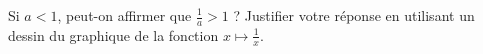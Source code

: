 
\begin{exercice}\label{exosmath-0257}

    Si \( a<1\), peut-on affirmer que \( \frac{1}{ a }>1\) ? Justifier votre réponse en utilisant un dessin du graphique de la fonction \( x\mapsto \frac{1}{ x }\).

\end{exercice}
